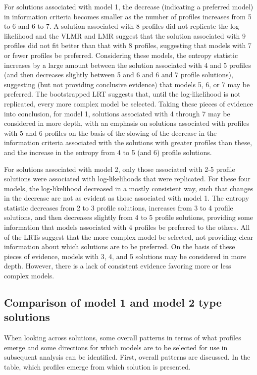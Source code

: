 \documentclass[]{book}
\theoremstyle{definition}
\theoremstyle{definition}
\theoremstyle{definition}
\theoremstyle{remark}
\begin{document}
For solutions associated with model 1, the decrease (indicating a
preferred model) in information criteria becomes smaller as the number
of profiles increases from 5 to 6 and 6 to 7. A solution associated with
8 profiles did not replicate the log-likelihood and the VLMR and LMR
suggest that the solution associated with 9 profiles did not fit better
than that with 8 profiles, suggesting that models with 7 or fewer
profiles be preferred. Considering these models, the entropy statistic
increases by a large amount between the solution associated with 4 and 5
profiles (and then decreases slightly between 5 and 6 and 6 and 7
profile solutions), suggesting (but not providing conclusive evidence)
that models 5, 6, or 7 may be preferred. The bootstrapped LRT suggests
that, until the log-likelihood is not replicated, every more complex
model be selected. Taking these pieces of evidence into conclusion, for
model 1, solutions associated with 4 through 7 may be considered in more
depth, with an emphasis on solutions associated with profiles with 5 and
6 profiles on the basis of the slowing of the decrease in the
information criteria associated with the solutions with greater profiles
than these, and the increase in the entropy from 4 to 5 (and 6) profile
solutions.

For solutions associated with model 2, only those associated with 2-5
profile solutions were associated with log-likelihoods that were
replicated. For these four models, the log-likelihood decreased in a
mostly consistent way, such that changes in the decrease are not as
evident as those associated with model 1. The entropy statistic
decreases from 2 to 3 profile solutions, increases from 3 to 4 profile
solutions, and then decreases slightly from 4 to 5 profile solutions,
providing some information that models associated with 4 profiles be
preferred to the others. All of the LRTs suggest that the more complex
model be selected, not providing clear information about which solutions
are to be preferred. On the basis of these pieces of evidence, models
with 3, 4, and 5 solutions may be considered in more depth. However,
there is a lack of consistent evidence favoring more or less complex
models.

\subsection{Comparison of model 1 and model 2 type
solutions}\label{comparison-of-model-1-and-model-2-type-solutions}

When looking across solutions, some overall patterns in terms of what
profiles emerge and some directions for which models are to be selected
for use in subsequent analysis can be identified. First, overall
patterns are discussed. In the table, which profiles emerge from which
solution is presented.
\end{document}
